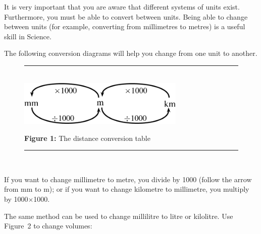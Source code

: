       \label{m30853*id67012}It is very important that you are aware that different systems of units exist. Furthermore, you must be able to convert between units. Being able to change between units (for example, converting from millimetres to metres) is a useful skill in Science.\par 
      \label{m30853*id67018}The following conversion diagrams will help you change from one unit to another.\par 
      
    \setcounter{subfigure}{0}


	\begin{figure}[H] %
    \begin{center}
    \rule[.1in]{\figurerulewidth}{.005in} \\
        \label{m30853*uid55!!!underscore!!!media}\label{m30853*uid55!!!underscore!!!printimage}\includegraphics[width=300px]{col11305.imgs/m30853_PG10C1_001.png} %
        
      \vspace{2pt}
    \vspace{\rubberspace}\par \begin{cnxcaption}
	  \small \textbf{Figure 1: }The distance conversion table
	\end{cnxcaption}
      
    \vspace{.1in}
    \rule[.1in]{\figurerulewidth}{.005in} \\
        
    \end{center}

 \end{figure}   

    \addtocounter{footnote}{-0}
    
      \label{m30853*id67034}If you want to change millimetre to metre, you divide by 1000 (follow the arrow from mm to m); or if you want to change kilometre to millimetre, you multiply by 1000\begin{math}\ensuremath{\times}\end{math}1000.\par 
      \label{m30853*id67048}The same method can be used to change millilitre to litre or kilolitre. Use Figure~2 to change volumes:\par 
      
